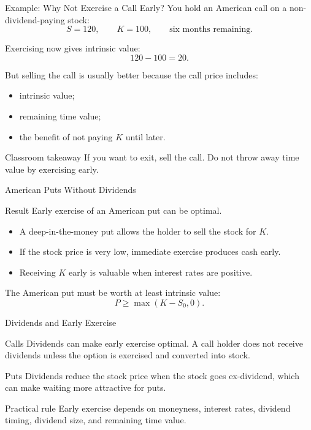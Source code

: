 \documentclass[aspectratio=169,11pt]{beamer}
\begin{document}
\begin{frame}{Example: Why Not Exercise a Call Early?}
    You hold an American call on a non-dividend-paying stock:
    \[
        S=120,\qquad K=100,\qquad \text{six months remaining.}
    \]

    Exercising now gives intrinsic value:
    \[
        120-100=20.
    \]

    But selling the call is usually better because the call price includes:
    \begin{itemize}
        \item intrinsic value;
        \item remaining time value;
        \item the benefit of not paying \(K\) until later.
    \end{itemize}

    \begin{alertblock}{Classroom takeaway}
        If you want to exit, sell the call. Do not throw away time value by exercising early.
    \end{alertblock}
\end{frame}

\begin{frame}{American Puts Without Dividends}
    \begin{alertblock}{Result}
        Early exercise of an American put can be optimal.
    \end{alertblock}

    \begin{itemize}
        \item A deep-in-the-money put allows the holder to sell the stock for \(K\).
        \item If the stock price is very low, immediate exercise produces cash early.
        \item Receiving \(K\) early is valuable when interest rates are positive.
    \end{itemize}

    \vspace{0.6em}
    The American put must be worth at least intrinsic value:
    \[
        P\geq \max(K-S_0,0).
    \]
\end{frame}

\begin{frame}{Dividends and Early Exercise}
    \begin{block}{Calls}
        Dividends can make early exercise optimal.
        A call holder does not receive dividends unless the option is exercised and converted into stock.
    \end{block}

    \begin{block}{Puts}
        Dividends reduce the stock price when the stock goes ex-dividend, which can make waiting more attractive for puts.
    \end{block}

    \begin{alertblock}{Practical rule}
        Early exercise depends on moneyness, interest rates, dividend timing, dividend size, and remaining time value.
    \end{alertblock}
\end{frame}
\end{document}
